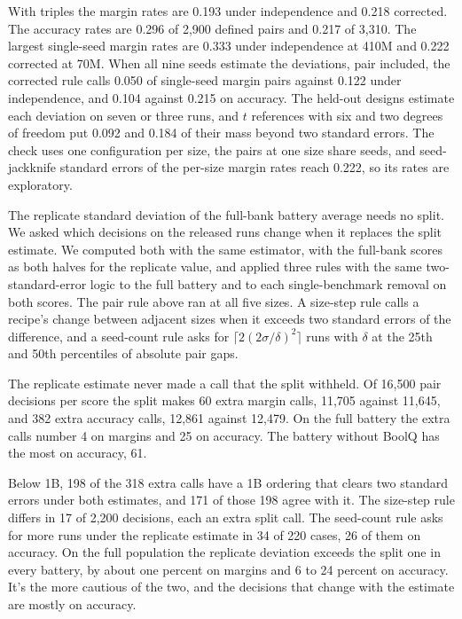 With triples the margin rates are 0.193 under independence and 0.218 corrected. The accuracy rates are 0.296 of 2,900 defined pairs and 0.217 of 3,310. The largest single-seed margin rates are 0.333 under independence at 410M and 0.222 corrected at 70M. When all nine seeds estimate the deviations, pair included, the corrected rule calls 0.050 of single-seed margin pairs against 0.122 under independence, and 0.104 against 0.215 on accuracy. The held-out designs estimate each deviation on seven or three runs, and $t$ references with six and two degrees of freedom put 0.092 and 0.184 of their mass beyond two standard errors. The check uses one configuration per size, the pairs at one size share seeds, and seed-jackknife standard errors of the per-size margin rates reach 0.222, so its rates are exploratory.

The replicate standard deviation of the full-bank battery average needs no split. We asked which decisions on the released runs change when it replaces the split estimate. We computed both with the same estimator, with the full-bank scores as both halves for the replicate value, and applied three rules with the same two-standard-error logic to the full battery and to each single-benchmark removal on both scores. The pair rule above ran at all five sizes. A size-step rule calls a recipe's change between adjacent sizes when it exceeds two standard errors of the difference, and a seed-count rule asks for $\lceil 2(2\sigma/\delta)^2\rceil$ runs with $\delta$ at the 25th and 50th percentiles of absolute pair gaps.

The replicate estimate never made a call that the split withheld. Of 16,500 pair decisions per score the split makes 60 extra margin calls, 11,705 against 11,645, and 382 extra accuracy calls, 12,861 against 12,479. On the full battery the extra calls number 4 on margins and 25 on accuracy. The battery without BoolQ has the most on accuracy, 61.

Below 1B, 198 of the 318 extra calls have a 1B ordering that clears two standard errors under both estimates, and 171 of those 198 agree with it. The size-step rule differs in 17 of 2,200 decisions, each an extra split call. The seed-count rule asks for more runs under the replicate estimate in 34 of 220 cases, 26 of them on accuracy. On the full population the replicate deviation exceeds the split one in every battery, by about one percent on margins and 6 to 24 percent on accuracy. It's the more cautious of the two, and the decisions that change with the estimate are mostly on accuracy.

